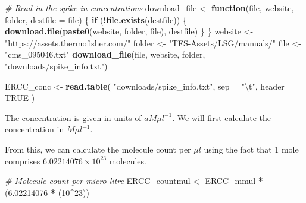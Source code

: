 \documentclass[9pt,a4paper,]{extarticle}
\newenvironment{Shaded}{\begin{snugshade}}{\end{snugshade}}
\newcommand{\CharTok}[1]{\textcolor[rgb]{0.31,0.60,0.02}{#1}}
\newcommand{\CommentTok}[1]{\textcolor[rgb]{0.56,0.35,0.01}{\textit{#1}}}
\newcommand{\ControlFlowTok}[1]{\textcolor[rgb]{0.13,0.29,0.53}{\textbf{#1}}}
\newcommand{\DataTypeTok}[1]{\textcolor[rgb]{0.13,0.29,0.53}{#1}}
\newcommand{\DecValTok}[1]{\textcolor[rgb]{0.00,0.00,0.81}{#1}}
\newcommand{\FloatTok}[1]{\textcolor[rgb]{0.00,0.00,0.81}{#1}}
\newcommand{\KeywordTok}[1]{\textcolor[rgb]{0.13,0.29,0.53}{\textbf{#1}}}
\newcommand{\NormalTok}[1]{#1}
\newcommand{\OperatorTok}[1]{\textcolor[rgb]{0.81,0.36,0.00}{\textbf{#1}}}
\newcommand{\OtherTok}[1]{\textcolor[rgb]{0.56,0.35,0.01}{#1}}
\newcommand{\StringTok}[1]{\textcolor[rgb]{0.31,0.60,0.02}{#1}}
\begin{document}
\begin{Shaded}
\begin{Highlighting}[]
\CommentTok{# Read in the spike-in concentrations}
\NormalTok{download_file <-}\StringTok{ }\ControlFlowTok{function}\NormalTok{(file, website, folder, }\DataTypeTok{destfile =}\NormalTok{ file) \{}
  \ControlFlowTok{if}\NormalTok{ (}\OperatorTok{!}\KeywordTok{file.exists}\NormalTok{(destfile)) \{}
    \KeywordTok{download.file}\NormalTok{(}\KeywordTok{paste0}\NormalTok{(website, folder, file), destfile)}
\NormalTok{  \}}
\NormalTok{\}}
\NormalTok{website <-}\StringTok{ "https://assets.thermofisher.com/"}
\NormalTok{folder <-}\StringTok{ "TFS-Assets/LSG/manuals/"}
\NormalTok{file <-}\StringTok{ "cms_095046.txt"}
\KeywordTok{download_file}\NormalTok{(file, website, folder, }\StringTok{"downloads/spike_info.txt"}\NormalTok{)}

\NormalTok{ERCC_conc <-}\StringTok{ }\KeywordTok{read.table}\NormalTok{(}
  \StringTok{"downloads/spike_info.txt"}\NormalTok{,}
  \DataTypeTok{sep =} \StringTok{"}\CharTok{\textbackslash{}t}\StringTok{"}\NormalTok{, }\DataTypeTok{header =} \OtherTok{TRUE}
\NormalTok{)}
\end{Highlighting}
\end{Shaded}

The concentration is given in units of \(aM\mu{}l^{-1}\).
We will first calculate the concentration in \(M\mu{}l^{-1}\).

\begin{Shaded}
\end{Shaded}

From this, we can calculate the molecule count per \(\mu{}l\) using the fact that
1 mole comprises \(6.02214076 \times 10^{23}\) molecules.

\begin{Shaded}
\begin{Highlighting}[]
\CommentTok{# Molecule count per micro litre}
\NormalTok{ERCC_countmul <-}\StringTok{ }\NormalTok{ERCC_mmul }\OperatorTok{*}\StringTok{ }\NormalTok{(}\FloatTok{6.02214076} \OperatorTok{*}\StringTok{ }\NormalTok{(}\DecValTok{10}\OperatorTok{^}\DecValTok{23}\NormalTok{))}
\end{Highlighting}
\end{Shaded}
\end{document}
